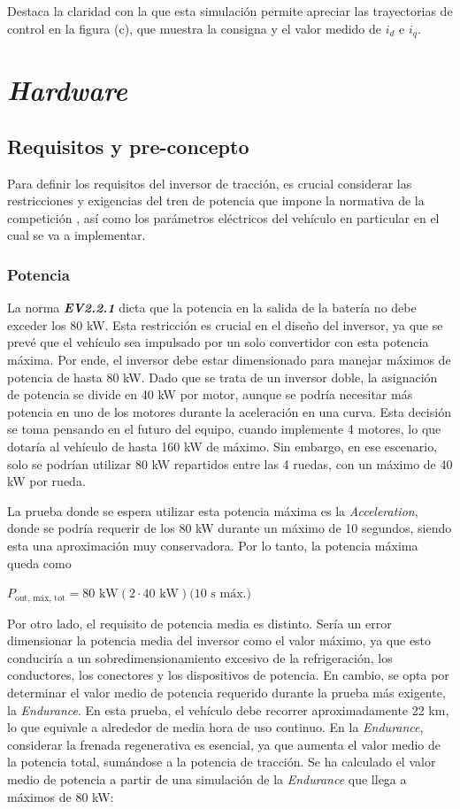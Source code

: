 Destaca la claridad con la que esta simulación permite apreciar las trayectorias de control en la figura (c), que muestra la consigna y el valor medido de $i_d$ e $i_q$.


\newpage
\section{\textit{Hardware}}

\subsection{Requisitos y pre-concepto}

Para definir los requisitos del inversor de tracción, es crucial considerar las restricciones y exigencias del tren de potencia que impone la normativa de la competición \cite{FSG}, así como los parámetros eléctricos del vehículo en particular en el cual se va a implementar.

\subsubsection{Potencia}
La norma \textit{\textbf{EV2.2.1}} dicta que la potencia en la salida de la batería no debe exceder los 80 kW. Esta restricción es crucial en el diseño del inversor, ya que se prevé que el vehículo sea impulsado por un solo convertidor con esta potencia máxima. Por ende, el inversor debe estar dimensionado para manejar máximos de potencia de hasta 80 kW. Dado que se trata de un inversor doble, la asignación de potencia se divide en 40 kW por motor, aunque se podría necesitar más potencia en uno de los motores durante la aceleración en una curva. Esta decisión se toma pensando en el futuro del equipo, cuando implemente 4 motores, lo que dotaría al vehículo de hasta 160 kW de máximo. Sin embargo, en ese escenario, solo se podrían utilizar 80 kW repartidos entre las 4 ruedas, con un máximo de 40 kW por rueda.

La prueba donde se espera utilizar esta potencia máxima es la \textit{Acceleration}, donde se podría requerir de los 80 kW durante un máximo de 10 segundos, siendo esta una aproximación muy conservadora. Por lo tanto, la potencia máxima queda como

\(P_{\text{out, máx, tot}} = 80 \text{ kW} (2 \cdot 40 \text{ kW}) \text{(10 s máx.)}\)


Por otro lado, el requisito de potencia media es distinto. Sería un error dimensionar la potencia media del inversor como el valor máximo, ya que esto conduciría a un sobredimensionamiento excesivo de la refrigeración, los conductores, los conectores y los dispositivos de potencia. En cambio, se opta por determinar el valor medio de potencia requerido durante la prueba más exigente, la \textit{Endurance}. En esta prueba, el vehículo debe recorrer aproximadamente 22 km, lo que equivale a alrededor de media hora de uso continuo. En la \textit{Endurance}, considerar la frenada regenerativa es esencial, ya que aumenta el valor medio de la potencia total, sumándose a la potencia de tracción. Se ha calculado el valor medio de potencia a partir de una simulación de la \textit{Endurance} que llega a máximos de 80 kW:

